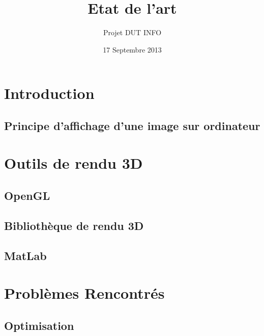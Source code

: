 \documentclass{report}
\title{Etat de l'art}
\author{Projet DUT INFO}
\date{17 Septembre 2013}
\begin{document}
\maketitle

\hypertarget{tableofcontents}{} %
\tableofcontents

\part{Introduction}

\chapter{Principe d'affichage d'une image sur ordinateur}


\part{Outils de rendu 3D}

\chapter{OpenGL}


\chapter{Bibliothèque de rendu 3D}


\chapter{MatLab}

\part{Problèmes Rencontrés}

\chapter{Optimisation}
\newpage
\end{document}
